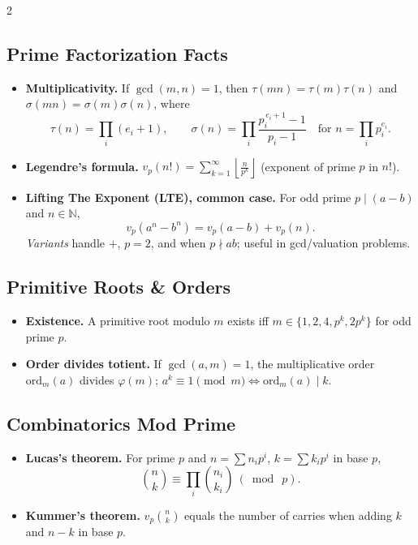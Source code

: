 \documentclass[8pt]{extarticle}
\theoremstyle{definition}
\begin{document}
\begin{multicols*}{2}
\subsection{Prime Factorization Facts}
\begin{itemize}
  \item \textbf{Multiplicativity.} If $\gcd(m,n)=1$, then $\tau(mn)=\tau(m)\tau(n)$ and $\sigma(mn)=\sigma(m)\sigma(n)$, where
  \[
    \tau(n)=\prod_{i}(e_i+1),\qquad
    \sigma(n)=\prod_{i}\frac{p_i^{\,e_i+1}-1}{p_i-1}\quad\text{for } n=\prod_i p_i^{e_i}.
  \]
  \item \textbf{Legendre's formula.} $v_p(n!)=\displaystyle\sum_{k=1}^{\infty}\left\lfloor \frac{n}{p^k}\right\rfloor$ (exponent of prime $p$ in $n!$).
  \item \textbf{Lifting The Exponent (LTE), common case.} For odd prime $p\mid (a-b)$ and $n\in\mathbb{N}$,
  \[
    v_p(a^n-b^n)=v_p(a-b)+v_p(n).
  \]
  \emph{Variants} handle $+$, $p=2$, and when $p\nmid ab$; useful in gcd/valuation problems.
\end{itemize}

\subsection{Primitive Roots \& Orders}
\begin{itemize}
  \item \textbf{Existence.} A primitive root modulo $m$ exists iff $m\in\{1,2,4,p^k,2p^k\}$ for odd prime $p$.
  \item \textbf{Order divides totient.} If $\gcd(a,m)=1$, the multiplicative order $\mathrm{ord}_m(a)$ divides $\varphi(m)$; $a^k\equiv 1\pmod m \iff \mathrm{ord}_m(a)\mid k$.
\end{itemize}

\subsection{Combinatorics Mod Prime}
\begin{itemize}
  \item \textbf{Lucas's theorem.} For prime $p$ and $n=\sum n_i p^i$, $k=\sum k_i p^i$ in base $p$,
  \[
    \binom{n}{k}\equiv \prod_i \binom{n_i}{k_i}\ (\bmod\ p).
  \]
  \item \textbf{Kummer's theorem.} $v_p\!\binom{n}{k}$ equals the number of carries when adding $k$ and $n-k$ in base $p$.
\end{itemize}


\end{multicols*}
\end{document}
